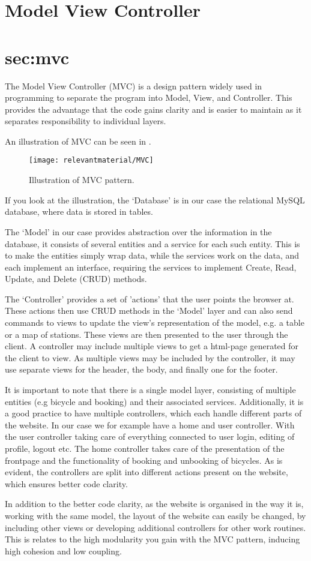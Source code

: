 \section{Model View Controller}\section{sec:mvc}
The Model View Controller (MVC) is a design pattern widely used in programming to separate the program into Model, View, and Controller.
This provides the advantage that the code gains clarity and is easier to maintain as it separates responsibility to individual layers.

An illustration of MVC can be seen in .
\begin{figure}[h]
	\centering
	\texttt{[image: relevantmaterial/MVC]}
	\caption{Illustration of MVC pattern.}\label{fig:MVC}
\end{figure}

If you look at the illustration, the `Database' is in our case the relational MySQL database, where data is stored in tables.

The `Model' in our case provides abstraction over the information in the database, it consists of several entities and a service for each such entity.
This is to make the entities simply wrap data, while the services work on the data, and each implement an interface, requiring the services to implement Create, Read, Update, and Delete (CRUD) methods.

The `Controller' provides a set of 'actions' that the user points the browser at. 
These actions then use CRUD methods in the `Model' layer and can also send commands to views to update the view's representation of the model, e.g. a table or a map of stations. 
These views are then presented to the user through the client.
A controller may include multiple views to get a html-page generated for the client to view.
As multiple views may be included by the controller, it may use separate views for the header, the body, and finally one for the footer.

It is important to note that there is a single model layer, consisting of multiple entities (e.g bicycle and booking) and their associated services.
Additionally, it is a good practice to have multiple controllers, which each handle different parts of the website.
In our case we for example have a home and user controller.
With the user controller taking care of everything connected to user login, editing of profile, logout etc.
The home controller takes care of the presentation of the frontpage and the functionality of booking and unbooking of bicycles.
As is evident, the controllers are split into different actions present on the website, which ensures better code clarity.

In addition to the better code clarity, as the website is organised in the way it is, working with the same model, the layout of the website can easily be changed, by including other views or developing additional controllers for other work routines.
This is relates to the high modularity you gain with the MVC pattern, inducing high cohesion and low coupling.